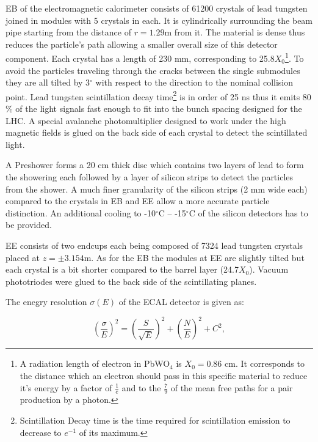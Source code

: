 EB of the electromagnetic calorimeter consists of 61200 crystals of lead tungsten joined in modules with 5 crystals in each. It is
cylindrically surrounding the beam pipe starting from the distance of $r = 1.29$m from it. 
The material is dense thus reduces the particle's path allowing a smaller overall size of this detector component. 
Each crystal has a length of 230 mm, corresponding to 25.8$X_{0}$\footnote{A radiation length of electron in PbWO$_{4}$ is 
$X_{0}=0.86$ cm. It corresponds to the distance which an electron should pass in this specific material to reduce it's 
energy by a factor of $\frac{1}{e}$ and to the $\frac{7}{9}$ of the mean free paths for a pair production by a photon.}. 
To avoid the particles traveling through the cracks between the single submodules they are all tilted by 3$^{\circ}$ with 
respect to the direction to the nominal collision point. Lead tungsten scintillation decay time\footnote{Scintillation Decay 
time is the time required for scintillation emission to decrease to $e^{-1}$ of its maximum.} is in order of 25 ns thus it 
emits 80$\%$ of the light signals fast enough to fit into the bunch spacing designed for the LHC. A special avalanche 
photomultiplier designed to work under the high magnetic fields is glued on the back side of each crystal to detect the scintillated light\cite{APDVPT}.

A Preshower forms a 20 cm thick disc which contains two layers of lead to form the showering each followed by a layer of silicon strips to
detect the particles from the shower. A much finer granularity of the silicon strips (2 mm wide each) compared to the 
crystals in EB and EE allow a more accurate particle distinction. An additional cooling to -10$^{\circ}$C -- -15$^{\circ}$C 
of the silicon detectors has to be provided.

EE consists of two endcups each being composed of 7324 lead tungsten crystals placed at $z = \pm 3.154$m. As for the EB the modules
at EE are slightly tilted but each crystal is a bit shorter compared to the barrel layer (24.7$X_{0}$). Vacuum phototriodes\cite{APDVPT} were
glued to the back side of the scintillating planes.

The enegry resolution $\sigma(E)$ of the ECAL detector is given as\cite{CMSatLHC}:

\begin{equation}\label{eq:resECAL}
  (\frac{\sigma}{E})^{2} = (\frac{S}{\sqrt{E}})^{2} + (\frac{N}{E})^{2} + C^{2},
\end{equation} 

